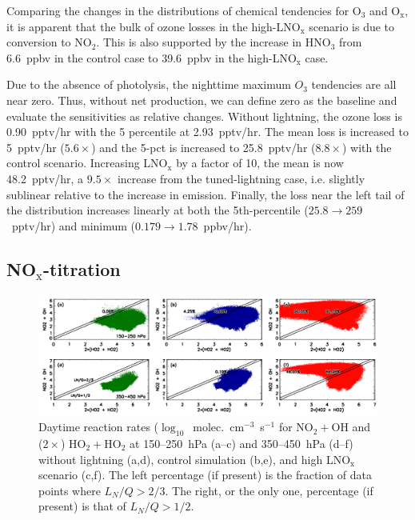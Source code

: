 Comparing the changes in the distributions of chemical tendencies for
O$_3$ and O$_{\mathrm{x}}$, it is apparent that the bulk of ozone losses in the
high-LNO$_{\mathrm{x}}$ scenario is due to conversion to NO$_2$. This is also
supported by the increase in HNO$_3$ from 6.6~ppbv in the control
case to 39.6~ppbv in the high-LNO$_{\mathrm{x}}$ case.

Due to the absence of photolysis, the nighttime maximum $O_3$ tendencies are all
near zero. Thus, without net production, we can define zero as the baseline and evaluate
the sensitivities as relative changes. Without lightning, the ozone loss is 0.90~pptv/hr
with the 5 percentile at 2.93~pptv/hr. The mean loss is increased to 5~pptv/hr
($5.6\times$) and the 5-pct is increased to 25.8~pptv/hr ($8.8\times$) with
the control scenario. Increasing LNO$_\mathrm{x}$ by a factor of 10, the mean
is now 48.2~pptv/hr, a $9.5\times$ increase from the tuned-lightning case, i.e.
slightly sublinear relative to the increase in emission. Finally, the loss near the
left tail of the distribution increases linearly at both the 5th-percentile
($25.8\rightarrow259$~pptv/hr) and minimum ($0.179\rightarrow1.78$~ppbv/hr).

\subsection{NO$_\mathrm{x}$-titration}

 \begin{figure}
 \noindent\includegraphics[width=40pc]{figures/rxn.png}
 \caption{Daytime reaction rates ($\log_{10}$~molec.~cm$^{-3}$~s$^{-1}$
for NO$_2+$OH and ($2\times$) HO$_2+$HO$_2$ at 150--250~hPa (a--c)
and 350--450~hPa (d--f) without lightning (a,d), control simulation (b,e),
and high LNO$_{\mathrm{x}}$ scenario (c,f). The left percentage (if present) is the fraction
of data points where $L_N/Q>2/3$. The right, or the only one, percentage (if present) is that
of $L_N/Q>1/2$.}
 \label{fig:ltng_rxn}
 \end{figure}


